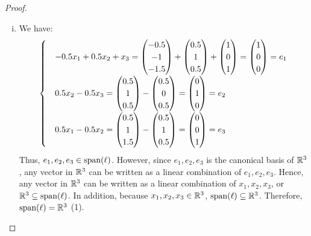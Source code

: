 \begin{proof}
    \renewcommand{\qedsymbol}{$\blacksquare$}
    \begin{enumerate}[(i)]
        \item We have:
        \begin{align*}
            \begin{cases}
                &-0.5x_1+0.5x_2+x_3
                =\begin{pmatrix} -0.5\\ -1\\ -1.5\end{pmatrix}+\begin{pmatrix} 0.5\\ 1\\ 0.5\end{pmatrix}+\begin{pmatrix} 1\\ 0\\ 1\end{pmatrix}
                =\begin{pmatrix} 1\\ 0\\ 0\end{pmatrix}
                =e_1\\
                &0.5x_2-0.5x_3
                =\begin{pmatrix} 0.5\\ 1\\ 0.5\end{pmatrix}-\begin{pmatrix} 0.5\\ 0\\ 0.5\end{pmatrix}
                =\begin{pmatrix} 0\\ 1\\ 0\end{pmatrix}
                =e_2\\
                &0.5x_1-0.5x_2
                =\begin{pmatrix} 0.5\\ 1\\ 1.5\end{pmatrix}-\begin{pmatrix} 0.5\\ 1\\ 0.5\end{pmatrix}
                =\begin{pmatrix} 0\\ 0\\ 1\end{pmatrix}
                =e_3
            \end{cases}
        \end{align*}
        Thus, $e_1,e_2,e_3\in\textnormal{span}(\ell)$. However, since $e_1,e_2,e_3$ is the canonical basis of $\mathbb R^3$, any vector in $\mathbb R^3$ can be written as a linear combination of $e_1,e_2,e_3$. Hence, any vector in $\mathbb R^3$ can be written as a linear combination of $x_1,x_2,x_3$, or $\mathbb R^3\subseteq\textnormal{span}(\ell)$.
        In addition, because $x_1,x_2,x_3\in\mathbb R^3$, $\textnormal{span}(\ell)\subseteq\mathbb R^3$. Therefore, $\textnormal{span}(\ell)=\mathbb R^3$ (1).


\end{enumerate}
\end{proof}
